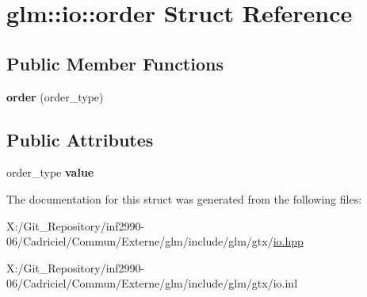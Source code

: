 \hypertarget{structglm_1_1io_1_1order}{\section{glm\-:\-:io\-:\-:order Struct Reference}
\label{structglm_1_1io_1_1order}
}
\subsection*{Public Member Functions}
\begin{DoxyCompactItemize}
\item 
\hypertarget{structglm_1_1io_1_1order_a06813d404c975865fdd3a77146268a1f}{{\bfseries order} (order\-\_\-type)}\label{structglm_1_1io_1_1order_a06813d404c975865fdd3a77146268a1f}

\end{DoxyCompactItemize}
\subsection*{Public Attributes}
\begin{DoxyCompactItemize}
\item 
\hypertarget{structglm_1_1io_1_1order_aa8788dd0568bacd081d02bd5aca9889b}{order\-\_\-type {\bfseries value}}\label{structglm_1_1io_1_1order_aa8788dd0568bacd081d02bd5aca9889b}

\end{DoxyCompactItemize}


The documentation for this struct was generated from the following files\-:\begin{DoxyCompactItemize}
\item 
X\-:/\-Git\-\_\-\-Repository/inf2990-\/06/\-Cadriciel/\-Commun/\-Externe/glm/include/glm/gtx/\hyperlink{io_8hpp}{io.\-hpp}\item 
X\-:/\-Git\-\_\-\-Repository/inf2990-\/06/\-Cadriciel/\-Commun/\-Externe/glm/include/glm/gtx/io.\-inl\end{DoxyCompactItemize}
